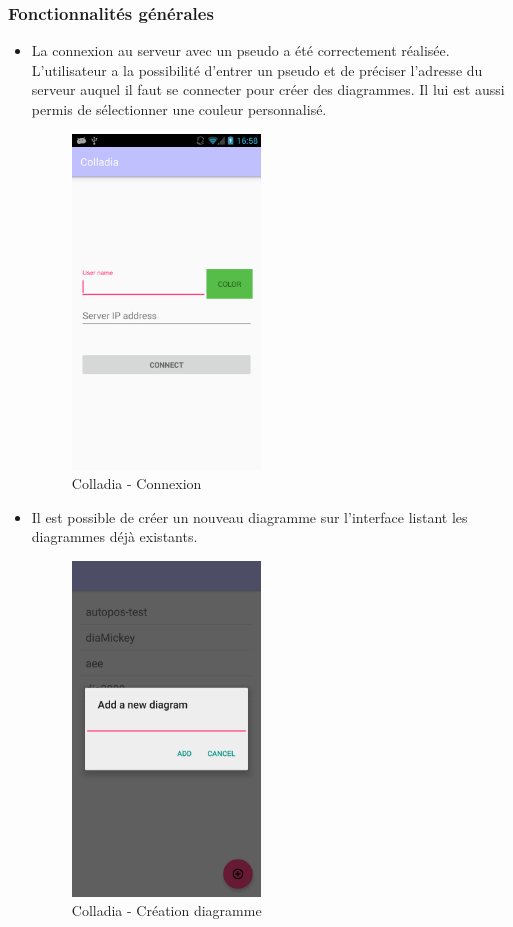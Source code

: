 \subsubsection{Fonctionnalités générales}
	\begin{itemize}
		\item La connexion au serveur avec un pseudo a été correctement réalisée. L'utilisateur a la possibilité d'entrer un pseudo et de préciser l'adresse du serveur auquel il faut se connecter pour créer des diagrammes. Il lui est aussi permis de sélectionner une couleur personnalisé. 
		\begin{figure}[!h]
			\centering
			\includegraphics[width=5cm]{img/screen/new/colladia_connexion}
			\caption{Colladia - Connexion}
		\end{figure}
		
		\item Il est possible de créer un nouveau diagramme sur l'interface listant les diagrammes déjà existants.
		\begin{figure}[!h]
			\centering
			\includegraphics[width=5cm]{img/screen/colladia_create_workspace}
			\caption{Colladia - Création diagramme}
		\end{figure}
		

\end{itemize}

